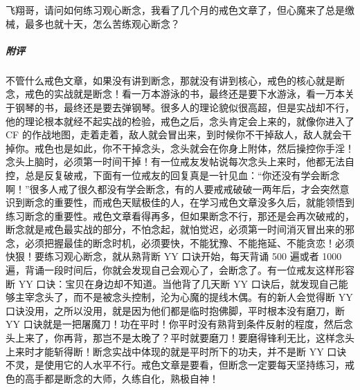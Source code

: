 \begin{case}
    飞翔哥，请问如何练习观心断念，我看了几个月的戒色文章了，但心魔来了总是缴械，最多也就十天，怎么苦练观心断念？
    \subparagraph{附评} 不管什么戒色文章，如果没有讲到断念，那就没有讲到核心，戒色的核心就是断念，戒色的实战就是断念！看一万本游泳的书，最终还是要下水游泳，看一万本关于钢琴的书，最终还是要去弹钢琴。很多人的理论貌似很高超，但是实战却不行，他的理论根本就经不起实战的检验，戒色之后，念头肯定会上来的，就像你进入了 CF 的作战地图，走着走着，敌人就会冒出来，到时候你不干掉敌人，敌人就会干掉你。戒色也是如此，你不干掉念头，念头就会在你身上附体，然后操控你手淫！念头上脑时，必须第一时间干掉！有一位戒友发帖说每次念头上来时，他都无法自控，总是反复破戒，下面有一位戒友的回复真是一针见血：“你还没有学会断念啊！”很多人戒了很久都没有学会断念，有的人要戒戒破破一两年后，才会突然意识到断念的重要性，而戒色天赋极佳的人，在学习戒色文章没多久后，就能领悟到练习断念的重要性。戒色文章看得再多，但如果断念不行，那还是会再次破戒的，断念就是戒色最实战的部分，不怕念起，就怕觉迟，必须第一时间消灭冒出来的邪念，必须把握最佳的断念时机，必须要快，不能犹豫、不能拖延、不能贪恋！必须快狠！要练习观心断念，就从熟背断 YY 口诀开始，每天背诵 500 遍或者 1000 遍，背诵一段时间后，你就会发现自己会观心了，会断念了。有一位戒友这样形容断 YY 口诀：宝贝在身边却不知道。当他背了几天断 YY 口诀后，就发现自己能够主宰念头了，而不是被念头控制，沦为心魔的提线木偶。有的新人会觉得断 YY 口诀没用，之所以没用，就是因为他们都是临时抱佛脚，平时根本没有磨刀，断 YY 口诀就是一把屠魔刀！功在平时！你平时没有熟背到条件反射的程度，然后念头上来了，你再背，那岂不是太晚了？平时就要磨刀！要磨得锋利无比，这样念头上来时才能斩得断！断念实战中体现的就是平时所下的功夫，并不是断 YY 口诀不灵，是使用它的人水平不行。戒色文章是要看，但断念一定要每天坚持练习，戒色的高手都是断念的大师，久练自化，熟极自神！
\end{case}

